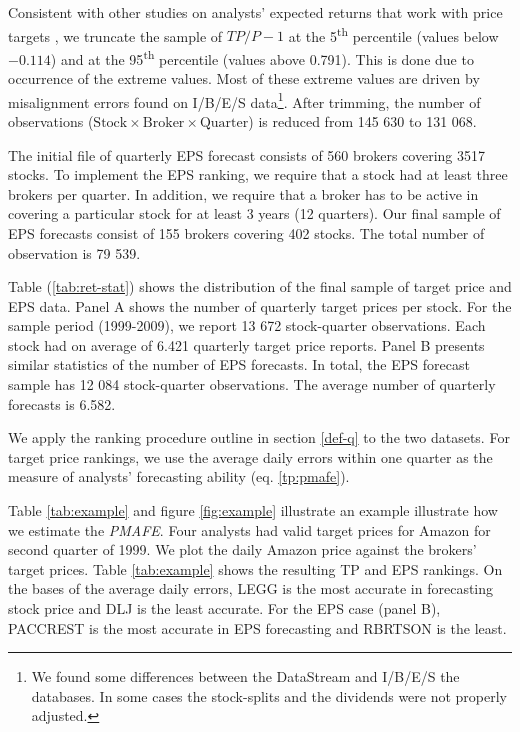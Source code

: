 \documentclass{article}\usepackage[]{graphicx}\usepackage[]{color}
\begin{document}
Consistent with other studies on analysts' expected returns that work with price targets  \citep{bradshaw2002,brav2003,da2011}, we truncate the sample of $TP/P-1$ at the 5\textsuperscript{th} percentile (values below \ensuremath{-0.114}) and at the 95\textsuperscript{th} percentile (values above 0.791). This is done due to occurrence of the extreme values. Most of these extreme values are driven by misalignment errors found on I/B/E/S data\footnote{We found some differences between the  DataStream and I/B/E/S the databases. In some cases the stock-splits and the dividends were not properly adjusted.}. After trimming, the number of observations ($\mathrm{Stock} \times \mathrm{Broker} \times  \mathrm{Quarter}$) is reduced  from 145 630 to 131 068.

The initial file of quarterly EPS forecast consists of  560 brokers covering 3517 stocks. To implement the EPS ranking, we require that a stock had at least three brokers per quarter. In addition, we require that a broker has to be active in covering a particular stock for at least 3 years (12 quarters). Our final sample of EPS forecasts consist of  155 brokers covering 402 stocks. The total number of observation is 79 539.
 

Table (\ref{tab:ret-stat}) shows the distribution of the final sample of target price and EPS data. Panel A shows the number of quarterly target prices per stock. For the sample period (1999-2009), we report 13 672 stock-quarter observations. Each stock had on average of 6.421 quarterly target price reports. Panel B  presents similar statistics of the number of EPS forecasts. In total, the EPS forecast sample has 12 084 stock-quarter observations. The average number of quarterly forecasts is 6.582.

We apply the ranking procedure outline in section \ref{def-q} to the two datasets. For target price rankings, we use the average daily errors within one quarter as the measure of analysts' forecasting ability (eq. \ref{tp:pmafe}). 

Table \ref{tab:example} and figure \ref{fig:example} illustrate an example illustrate how we estimate the \textit{PMAFE}. Four analysts had valid target prices for Amazon for second quarter of 1999. We plot the daily Amazon price against the brokers' target prices. Table \ref{tab:example} shows the resulting TP and EPS rankings. On the bases of the average daily errors, LEGG is the most accurate in forecasting stock price and  DLJ is the least accurate. For the EPS case (panel B), PACCREST is the most accurate in EPS forecasting and RBRTSON is the least. 
\end{document}
